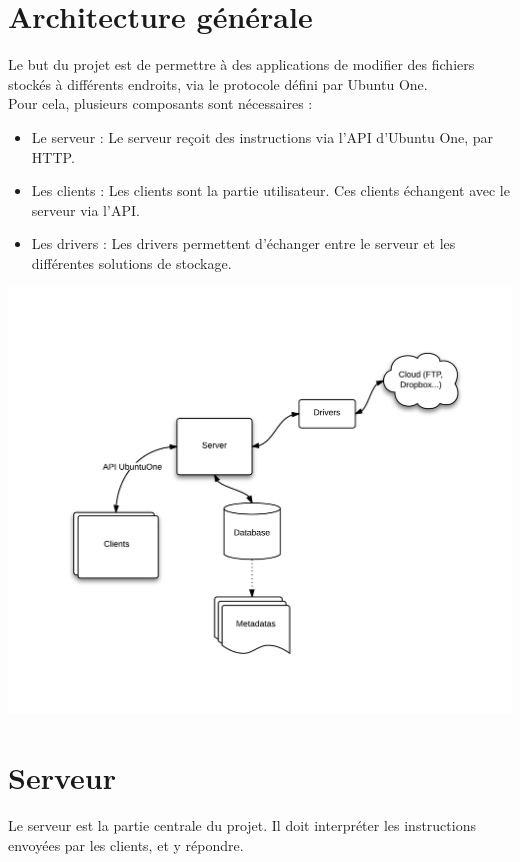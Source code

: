 \section{Architecture générale}
Le but du projet est de permettre à des applications de modifier des fichiers stockés à différents endroits, via le protocole défini par Ubuntu One.\\

Pour cela, plusieurs composants sont nécessaires :
\begin{itemize}
\renewcommand{\labelitemi}{$\bullet$}
   \item Le serveur : Le serveur reçoit des instructions via l'API d'Ubuntu One, par HTTP.
   \item Les clients : Les clients sont la partie utilisateur. Ces clients échangent avec le serveur via l'API. 
   \item Les drivers : Les drivers permettent d'échanger entre le serveur et les différentes solutions de stockage. 
\end{itemize}

\includegraphics[width=500pt]{architecture.png}

\section{Serveur}
Le serveur est la partie centrale du projet. Il doit interpréter les instructions envoyées par les clients, et y répondre.\\


